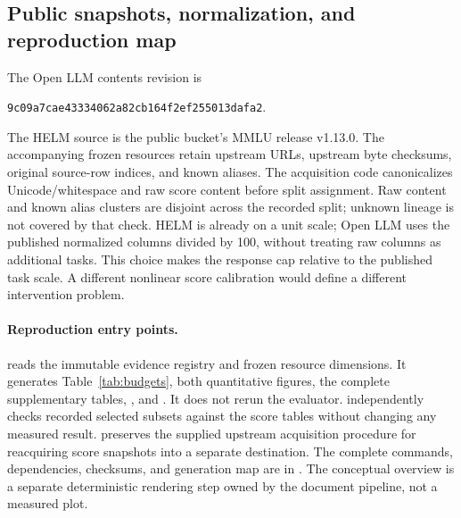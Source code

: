 \documentclass{article}
\begin{document}
\subsection{Public snapshots, normalization, and reproduction map}\label{sec:repro}
The Open LLM contents revision is
\begin{center}\small\texttt{9c09a7cae43334062a82cb164f2ef255013dafa2}.\end{center}
The HELM source is the public bucket's MMLU release v1.13.0. The accompanying frozen resources retain upstream URLs, upstream byte checksums, original source-row indices, and known aliases. The acquisition code canonicalizes Unicode/whitespace and raw score content before split assignment. Raw content and known alias clusters are disjoint across the recorded split; unknown lineage is not covered by that check. HELM is already on a unit scale; Open LLM uses the published normalized columns divided by 100, without treating raw columns as additional tasks. This choice makes the response cap relative to the published task scale. A different nonlinear score calibration would define a different intervention problem.

\paragraph{Reproduction entry points.}
 reads the immutable evidence registry and frozen resource dimensions. It generates Table~\ref{tab:budgets}, both quantitative figures, the complete supplementary tables, , and . It does not rerun the evaluator.  independently checks recorded selected subsets against the score tables without changing any measured result.  preserves the supplied upstream acquisition procedure for reacquiring score snapshots into a separate destination. The complete commands, dependencies, checksums, and generation map are in . The conceptual overview is a separate deterministic rendering step owned by the document pipeline, not a measured plot.
\end{document}
